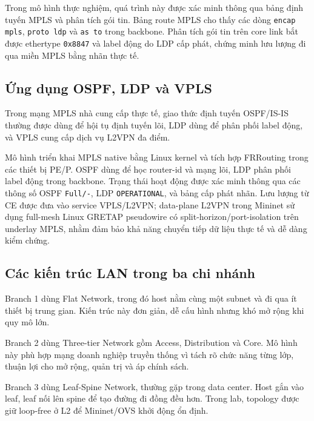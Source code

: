 Trong mô hình thực nghiệm, quá trình này được xác minh thông qua bảng định tuyến MPLS và phân tích gói tin. Bảng route MPLS cho thấy các dòng \texttt{encap mpls}, \texttt{proto ldp} và \texttt{as to} trong backbone. Phân tích gói tin trên core link bắt được ethertype \texttt{0x8847} và label động do LDP cấp phát, chứng minh lưu lượng đi qua miền MPLS bằng nhãn thực tế.

\subsection{Ứng dụng OSPF, LDP và VPLS}

Trong mạng MPLS nhà cung cấp thực tế, giao thức định tuyến OSPF/IS-IS thường được dùng để hội tụ định tuyến lõi, LDP dùng để phân phối label động, và VPLS cung cấp dịch vụ L2VPN đa điểm.

Mô hình triển khai MPLS native bằng Linux kernel và tích hợp FRRouting trong các thiết bị PE/P. OSPF dùng để học router-id và mạng lõi, LDP phân phối label động trong backbone. Trạng thái hoạt động được xác minh thông qua các thông số OSPF \texttt{Full/-}, LDP \texttt{OPERATIONAL}, và bảng cấp phát nhãn. Lưu lượng từ CE được đưa vào service VPLS/L2VPN; data-plane L2VPN trong Mininet sử dụng full-mesh Linux GRETAP pseudowire có split-horizon/port-isolation trên underlay MPLS, nhằm đảm bảo khả năng chuyển tiếp dữ liệu thực tế và dễ dàng kiểm chứng.

\subsection{Các kiến trúc LAN trong ba chi nhánh}

Branch 1 dùng Flat Network, trong đó host nằm cùng một subnet và đi qua ít thiết bị trung gian. Kiến trúc này đơn giản, dễ cấu hình nhưng khó mở rộng khi quy mô lớn.

Branch 2 dùng Three-tier Network gồm Access, Distribution và Core. Mô hình này phù hợp mạng doanh nghiệp truyền thống vì tách rõ chức năng từng lớp, thuận lợi cho mở rộng, quản trị và áp chính sách.

Branch 3 dùng Leaf-Spine Network, thường gặp trong data center. Host gắn vào leaf, leaf nối lên spine để tạo đường đi đồng đều hơn. Trong lab, topology được giữ loop-free ở L2 để Mininet/OVS khởi động ổn định.
